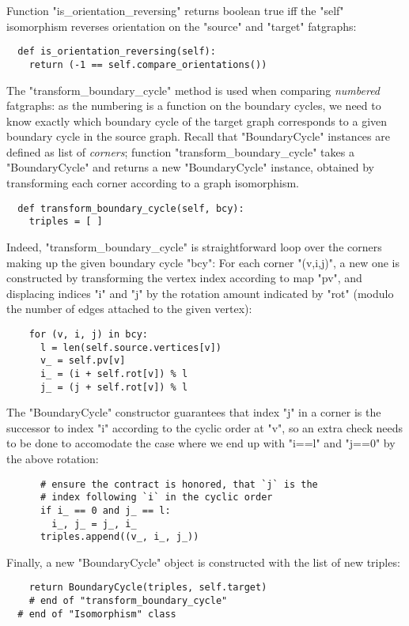 Function "is_orientation_reversing" returns boolean true iff the
"self" isomorphism reverses orientation on the "source" and "target"
fatgraphs: 
\begin{lstlisting}
  def is_orientation_reversing(self):
    return (-1 == self.compare_orientations())

\end{lstlisting}

The "transform_boundary_cycle" method is used when comparing
\emph{numbered} fatgraphs: as the numbering is a function on the
boundary cycles, we need to know exactly which boundary cycle of the
target graph corresponds to a given boundary cycle in the source
graph.  Recall that "BoundaryCycle" instances are defined as list of
\emph{corners}; function "transform_boundary_cycle" takes a
"BoundaryCycle" and returns a new "BoundaryCycle" instance, obtained
by transforming each corner according to a graph isomorphism.
\begin{lstlisting}
  def transform_boundary_cycle(self, bcy):
    triples = [ ]
\end{lstlisting}
Indeed, "transform_boundary_cycle" is straightforward loop over the
corners making up the given boundary cycle "bcy":
For each corner "(v,i,j)", a new one is constructed by transforming
the vertex index according to map "pv", and displacing indices "i" and
"j" by the rotation amount indicated by "rot" (modulo the number of
edges attached to the given vertex):
\begin{lstlisting}
    for (v, i, j) in bcy:
      l = len(self.source.vertices[v])
      v_ = self.pv[v]
      i_ = (i + self.rot[v]) % l
      j_ = (j + self.rot[v]) % l
\end{lstlisting}
The "BoundaryCycle" constructor guarantees that index "j" in
a corner is the successor to index "i" according to the cyclic order
at "v", so an extra check needs to be done to accomodate the case
where we end up with "i==l" and "j==0" by the above rotation:
\begin{lstlisting}
      # ensure the contract is honored, that `j` is the
      # index following `i` in the cyclic order
      if i_ == 0 and j_ == l:
        i_, j_ = j_, i_
      triples.append((v_, i_, j_))
\end{lstlisting}
Finally, a new "BoundaryCycle" object is constructed with the list of
new triples:
\begin{lstlisting}
    return BoundaryCycle(triples, self.target)
    # end of "transform_boundary_cycle"
  # end of "Isomorphism" class
\end{lstlisting}



